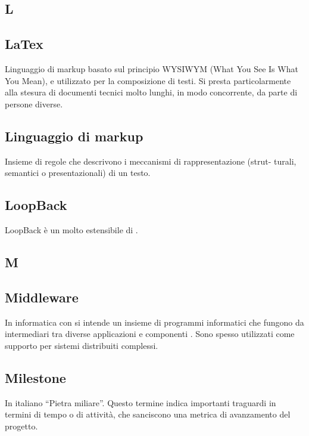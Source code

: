 \newpage

\begin{center}
\Huge\section{\uppercase{L}}
\end{center}

\subsection{LaTex}
Linguaggio di markup basato sul principio WYSIWYM (What You See Is What You
Mean), e utilizzato per la composizione di testi. Si presta particolarmente alla stesura di
documenti tecnici molto lunghi, in modo concorrente, da parte di persone diverse.

\subsection{Linguaggio di markup}
Insieme di regole che descrivono i meccanismi di rappresentazione (strut-
turali, semantici o presentazionali) di un testo.

\subsection{LoopBack}
LoopBack è un   molto estensibile di . 

\newpage

\begin{center}
\Huge\section{\uppercase{M}}
\end{center}

\subsection{Middleware}
In informatica con  si intende un insieme di programmi informatici che fungono da intermediari tra diverse applicazioni e componenti . Sono spesso utilizzati come supporto per sistemi distribuiti complessi.

\subsection{Milestone}
In italiano “Pietra miliare”. Questo termine indica importanti traguardi in termini di
tempo o di attività, che sanciscono una metrica di avanzamento del progetto.

